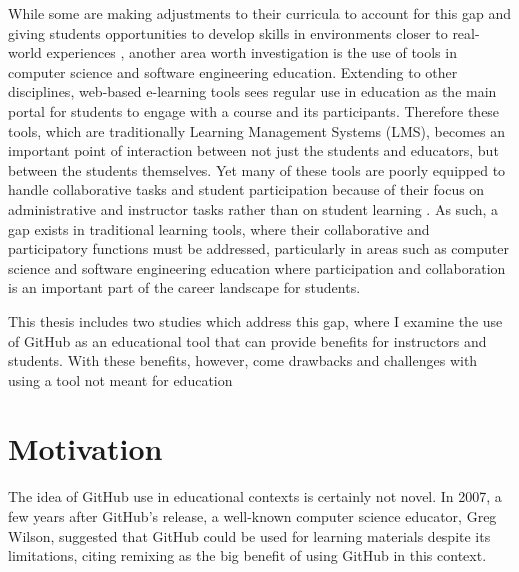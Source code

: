 While some are making adjustments to their curricula to account for this gap \cite{jazayeri2004education} and giving students opportunities to develop skills in environments closer to real-world experiences \cite{coleman2012collaboration}, another area worth investigation is the use of tools in computer science and software engineering education. Extending to other disciplines, web-based e-learning tools sees regular use in education as the main portal for students to engage with a course and its participants. Therefore these tools, which are traditionally Learning Management Systems (LMS), becomes an important point of interaction between not just the students and educators, but between the students themselves. Yet many of these tools are poorly equipped to handle collaborative tasks and student participation because of their focus on administrative and instructor tasks rather than on student learning \cite{mcloughlin2007social}. As such, a gap exists in traditional learning tools, where their collaborative and participatory functions must be addressed, particularly in areas such as computer science and software engineering education where participation and collaboration is an important part of the career landscape for students.


This thesis includes two studies which address this gap, where I examine the use of GitHub as an educational tool that can provide benefits for instructors and students. With these benefits, however, come drawbacks and challenges with using a tool not meant for education

\section{Motivation}
The idea of GitHub use in educational contexts is certainly not novel. In 2007, a few years after GitHub's release, a well-known computer science educator, Greg Wilson, suggested that GitHub could be used for learning materials despite its limitations, citing remixing as the big benefit of using GitHub in this context.

